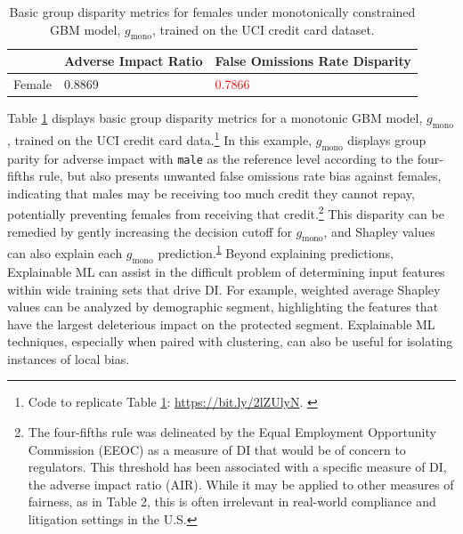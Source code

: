 \documentclass{article}
\begin{document}
\begin{table}
  	\caption{Basic group disparity metrics for females under monotonically constrained GBM model, $g_{\text{mono}}$, trained on the UCI credit card dataset.\\}
  	\label{tab:dia}
  	\centering
  	\begin{tabular}{lll}
    	\toprule
    	& Adverse Impact Ratio & False Omissions Rate Disparity \\
    	\midrule
		Female & 0.8869 & \textcolor{red}{0.7866} \\
    	\bottomrule
  \end{tabular}
\end{table}

Table \ref{tab:dia} displays basic group disparity metrics for a monotonic GBM model, $g_{\text{mono}}$, trained on the UCI credit card data.\footnote{\scriptsize{Code to replicate Table \ref{tab:dia}:  \url{https://bit.ly/2lZUlyN}.} \label{fn:dia}} In this example, $g_{\text{mono}}$ displays group parity for adverse impact with \texttt{male} as the reference level according to the four-fifths rule, but also presents unwanted false omissions rate bias against females, indicating that males may be receiving too much credit they cannot repay, potentially preventing females from receiving that credit.\footnote{\scriptsize{The four-fifths rule was delineated by the Equal Employment Opportunity Commission (EEOC) as a measure of DI that would be of concern to regulators. This threshold has been associated with a specific measure of DI, the adverse impact ratio (AIR). While it may be applied to other measures of fairness, as in Table 2, this is often irrelevant in real-world compliance and litigation settings in the U.S.}} This disparity can be remedied by gently increasing the decision cutoff for $g_{\text{mono}}$, and Shapley values can also explain each $g_{\text{mono}}$ prediction.\textsuperscript{\ref{fn:dia}} Beyond explaining predictions, Explainable ML can assist in the difficult problem of determining input features within wide training sets that drive DI. For example, weighted average Shapley values can be analyzed by demographic segment, highlighting the features that have the largest deleterious impact on the protected segment. Explainable ML techniques, especially when paired with clustering, can also be useful for isolating instances of local bias. 
\end{document}
